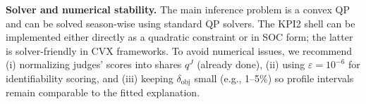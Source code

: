 \textbf{Solver and numerical stability.}
The main inference problem is a convex QP and can be solved season-wise using standard QP solvers.
The KPI2 shell can be implemented either directly as a quadratic constraint or in SOC form; the latter is solver-friendly in CVX frameworks.
To avoid numerical issues, we recommend
(i) normalizing judges' scores into shares $q^J$ (already done),
(ii) using $\varepsilon=10^{-6}$ for identifiability scoring,
and (iii) keeping $\delta_{\mathrm{obj}}$ small (e.g., 1--5\%) so profile intervals remain comparable to the fitted explanation.




